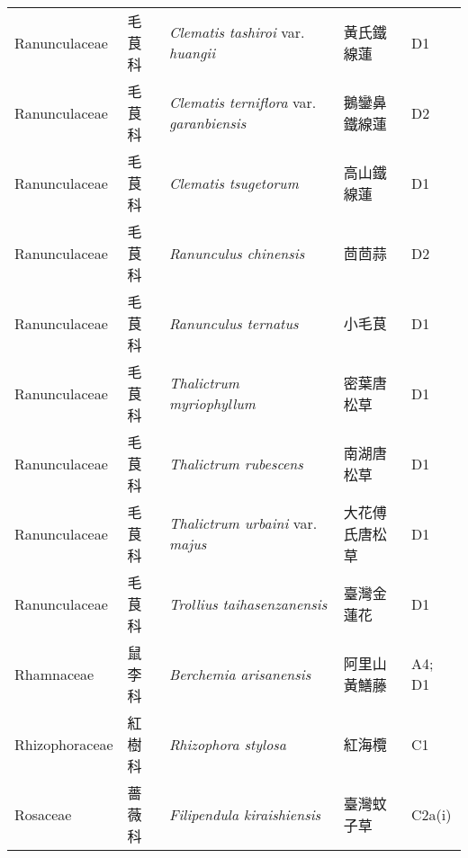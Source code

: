 {\begin{longtable}{p{2.5cm}p{2.5cm}p{4.5cm}p{2.5cm}p{3cm}}
    Ranunculaceae & 毛茛科 & \textit{Clematis tashiroi} var. \textit{huangii}  & 黃氏鐵線蓮 & D1 \index{Clematis@\textit{Clematis}!tashiroi@\textit{tashiroi}!var. huangii@var. \textit{huangii}}  \index{黃氏鐵線蓮} \\
    Ranunculaceae & 毛茛科 & \textit{Clematis terniflora} var. \textit{garanbiensis}  & 鵝鑾鼻鐵線蓮 & D2 \index{Clematis@\textit{Clematis}!terniflora@\textit{terniflora}!var. garanbiensis@var. \textit{garanbiensis}}  \index{鵝鑾鼻鐵線蓮} \\
    Ranunculaceae & 毛茛科 & \textit{Clematis tsugetorum}  & 高山鐵線蓮 & D1 \index{Clematis@\textit{Clematis}!tsugetorum@\textit{tsugetorum}}  \index{高山鐵線蓮} \\
    Ranunculaceae & 毛茛科 & \textit{Ranunculus chinensis}  & 茴茴蒜 & D2 \index{Ranunculus@\textit{Ranunculus}!chinensis@\textit{chinensis}}  \index{茴茴蒜} \\
    Ranunculaceae & 毛茛科 & \textit{Ranunculus ternatus}  & 小毛茛 & D1 \index{Ranunculus@\textit{Ranunculus}!ternatus@\textit{ternatus}}  \index{小毛茛} \\
    Ranunculaceae & 毛茛科 & \textit{Thalictrum myriophyllum}  & 密葉唐松草 & D1 \index{Thalictrum@\textit{Thalictrum}!myriophyllum@\textit{myriophyllum}}  \index{密葉唐松草} \\
    Ranunculaceae & 毛茛科 & \textit{Thalictrum rubescens}  & 南湖唐松草 & D1 \index{Thalictrum@\textit{Thalictrum}!rubescens@\textit{rubescens}}  \index{南湖唐松草} \\
    Ranunculaceae & 毛茛科 & \textit{Thalictrum urbaini} var. \textit{majus}  & 大花傅氏唐松草 & D1 \index{Thalictrum@\textit{Thalictrum}!urbaini@\textit{urbaini}!var. majus@var. \textit{majus}}  \index{大花傅氏唐松草} \\
    Ranunculaceae & 毛茛科 & \textit{Trollius taihasenzanensis}  & 臺灣金蓮花 & D1 \index{Trollius@\textit{Trollius}!taihasenzanensis@\textit{taihasenzanensis}}  \index{臺灣金蓮花} \\
    Rhamnaceae & 鼠李科 & \textit{Berchemia arisanensis}  & 阿里山黃鱔藤 & A4; D1 \index{Berchemia@\textit{Berchemia}!arisanensis@\textit{arisanensis}}  \index{阿里山黃鱔藤} \\
    Rhizophoraceae & 紅樹科 & \textit{Rhizophora stylosa}  & 紅海欖 & C1 \index{Rhizophora@\textit{Rhizophora}!stylosa@\textit{stylosa}}  \index{紅海欖} \\
    Rosaceae & 薔薇科 & \textit{Filipendula kiraishiensis}  & 臺灣蚊子草 & C2a(i) \index{Filipendula@\textit{Filipendula}!kiraishiensis@\textit{kiraishiensis}}  \index{臺灣蚊子草} \\

\end{longtable}}
